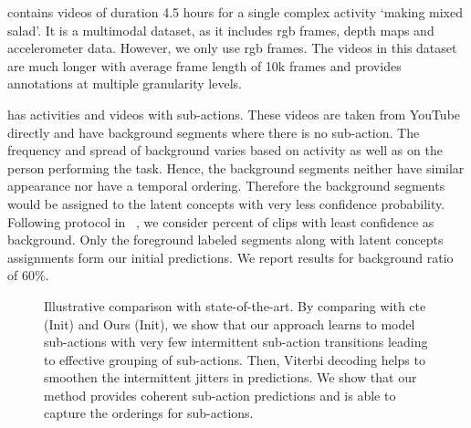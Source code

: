 \documentclass[final]{cvpr}
\begin{document}
 contains videos of duration 4.5 hours for a single complex activity `making mixed salad'. 
It is a multimodal dataset, as it includes {\sc rgb} frames, depth maps and accelerometer data. However, we only use {\sc rgb} frames.
The videos in this dataset are much longer with average frame length of 10k frames and provides annotations at multiple granularity levels. 

 has  activities and  videos with  sub-actions.
These videos are taken from YouTube directly and have background segments where there is no sub-action.  The frequency and spread of background varies based on activity as well as on the person performing the task. Hence, the background segments neither have similar appearance nor have a temporal ordering. Therefore the background segments would be assigned to the latent concepts with very less confidence probability. Following protocol in ~\cite{kukleva2019unsupervised}, we consider  percent of clips with least confidence as background. Only the foreground labeled segments along with latent concepts assignments form our initial predictions. We report results for background ratio of 60\%. \begin{figure}[tb]
\centering
{}
\hfil
{}
\caption{{\small Illustrative comparison with state-of-the-art. By comparing with {\sc cte} (Init) and Ours (Init), we show that our approach learns to model sub-actions with very few intermittent sub-action transitions leading to effective grouping of sub-actions.
Then, Viterbi decoding helps to smoothen the intermittent jitters in predictions.
We show that our method provides coherent sub-action predictions and is able to capture the orderings for sub-actions. 
}}
\vspace{-0.3cm}
\label{fig:qual_sota}
\end{figure}
\end{document}
